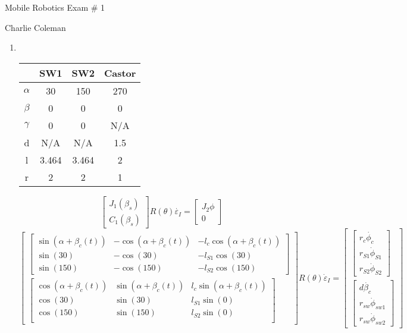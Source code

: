 \documentclass[12pt]{article}
\begin{document}
	\begin{center}
		\begin{large} Mobile Robotics Exam \# 1 \end{large}
	\end{center}
	
	\hfill Charlie Coleman
	
	\begin{enumerate}
		\item ~
		
		\begin{tabular}{|c|ccc|}
			\hline
			& SW1 & SW2 & Castor \\ \hline
			$\alpha$ & 30 & 150 & 270 \\
			$\beta$ & 0 & 0 & 0 \\
			$\gamma$ & 0 & 0 & N/A \\
			d & N/A & N/A & 1.5 \\
			l & 3.464 & 3.464 & 2 \\
			r & 2 & 2 & 1 \\ \hline
		\end{tabular}
		
		\[
			\begin{bmatrix}
				J_1 (\beta_s) \\
				C_1 (\beta_s)
			\end{bmatrix} R(\theta) \dot{\varepsilon_I} = \begin{bmatrix}
				J_2 \phi \\
				0
			\end{bmatrix}
		\]
		\[
			\begin{bmatrix}
				\begin{bmatrix}
					\sin(\alpha + \beta_c(t)) & -\cos(\alpha + \beta_c(t)) & -l_c\cos(\alpha + \beta_c(t)) \\
					\sin(30) & -\cos(30) & -l_{S1}\cos(30) \\
					\sin(150) & -\cos(150) & -l_{S2}\cos(150)
				\end{bmatrix}\\
				\begin{bmatrix}
					\cos(\alpha + \beta_c(t)) & \sin(\alpha + \beta_c(t)) & l_c \sin(\alpha + \beta_c(t)) \\
					\cos(30) & \sin(30) & l_{S1}\sin(0) \\
					\cos(150) & \sin(150) & l_{S2}\sin(0) \\
				\end{bmatrix}
			\end{bmatrix} R(\theta) \dot{\varepsilon}_I = \begin{bmatrix}
				\begin{bmatrix}
					r_c \dot{\phi_c} \\
					r_{S1} \dot{\phi}_{S1} \\
					r_{S2} \dot{\phi}_{S2}
				\end{bmatrix} \\
				\begin{bmatrix}
					d\dot{\beta_c} \\
					r_{sw} \dot{\phi}_{sw1} \\
					r_{sw} \dot{\phi}_{sw2}
				\end{bmatrix}
			\end{bmatrix}
		\]
	

\end{enumerate}
\end{document}
